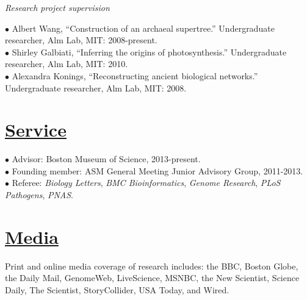 \documentclass[overlapped,line,11pt]{res}
\begin{document}
\begin{resume}
\newpage

\emph{Research project supervision}

\hangindent=0.5in $\bullet$\hspace{.1in} Albert Wang, ``Construction
of an archaeal supertree.''  Undergraduate researcher, Alm Lab, MIT:
2008-present.\\

\vspace{-10mm} \hangindent=0.5in $\bullet$\hspace{.1in} Shirley
Galbiati, ``Inferring the origins of photosynthesis.''
Undergraduate researcher, Alm Lab, MIT: 2010.\\

\vspace{-10mm} 
\hangindent=0.5in $\bullet$\hspace{.1in} Alexandra
Konings, ``Reconstructing ancient
biological networks.''  Undergraduate researcher, Alm Lab, MIT: 2008.

\section{\underline{\sc Service}}
\vspace{.25in}

\hangindent=0.5in $\bullet$\hspace{.1in} Advisor: Boston Museum of Science, 2013-present. \\

\vspace{-10mm}
\hangindent=0.5in $\bullet$\hspace{.1in} Founding member: ASM General Meeting
Junior Advisory Group, 2011-2013. \\

\vspace{-10mm} \hangindent=0.5in $\bullet$\hspace{.1in} Referee:
\emph{Biology Letters}, \emph{BMC Bioinformatics}, \emph{Genome
  Research}, \emph{PLoS Pathogens}, \emph{PNAS}.


\section{\underline{\sc Media}} 
\vspace{.25in} Print and online media coverage of research includes:
the BBC, Boston Globe, the Daily Mail, GenomeWeb, LiveScience, MSNBC,
the New Scientist, Science Daily, The Scientist, StoryCollider, USA Today, and Wired.


\end{resume}
\end{document}
